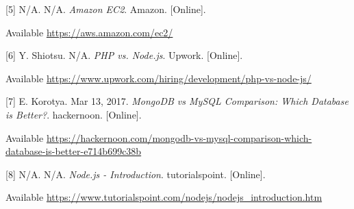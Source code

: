 \documentclass[onecolumn, draftclsnofoot,10pt, compsoc]{IEEEtran}
\begin{document}
[5] N/A. N/A. \textit{Amazon EC2}. Amazon. [Online].

Available \url{https://aws.amazon.com/ec2/}

[6] Y. Shiotsu. N/A. \textit{PHP vs. Node.js}. Upwork. [Online].

Available \url{https://www.upwork.com/hiring/development/php-vs-node-js/}

[7] E. Korotya. Mar 13, 2017. \textit{MongoDB vs MySQL Comparison: Which Database is Better?}. hackernoon. [Online].

Available \url{https://hackernoon.com/mongodb-vs-mysql-comparison-which-database-is-better-e714b699c38b}

[8] N/A. N/A. \textit{Node.js - Introduction}. tutorialspoint. [Online].

Available \url{https://www.tutorialspoint.com/nodejs/nodejs_introduction.htm}
\end{document}

